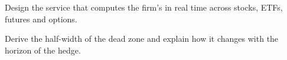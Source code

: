 \begin{interviewq}\label{iq:hf:hedging-and-inventory-in-practice:5}
Design the service that computes the firm's  in real time across stocks, ETFs, futures and options.
\end{interviewq}

\begin{interviewq}\label{iq:hf:hedging-and-inventory-in-practice:6}
Derive the half-width of the dead zone and explain how it changes with the horizon of the hedge.
\end{interviewq}
